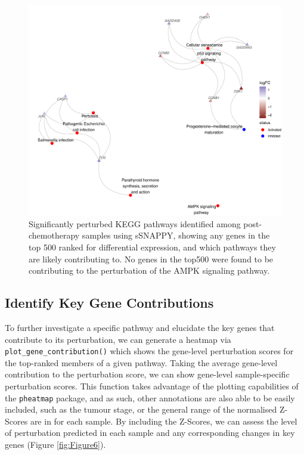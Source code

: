 \documentclass[9pt,a4paper,]{extarticle}
\begin{document}
\begin{figure}

{\centering \includegraphics[width=0.8\linewidth]{sSNAPPY_paper_files/figure-latex/Figure5-1} 

}

\caption{Significantly perturbed KEGG pathways identified among post-chemotherapy samples using sSNAPPY, showing any genes in the top 500 ranked for differential expression, and which pathways they are likely contributing to. No genes in the top500 were found to be contributing to the perturbation of the AMPK signaling pathway.}\label{fig:Figure5}
\end{figure}

\hypertarget{identify-key-gene-contributions}{%
\subsection{Identify Key Gene Contributions}\label{identify-key-gene-contributions}}

To further investigate a specific pathway and elucidate the key genes that contribute to its perturbation, we can generate a heatmap via \texttt{plot\_gene\_contribution()} which shows the gene-level perturbation scores for the top-ranked members of a given pathway.
Taking the average gene-level contribution to the perturbation score, we can show gene-level sample-specific perturbation scores.
This function takes advantage of the plotting capabilities of the \texttt{pheatmap} package\citep{pheatmap}, and as such, other annotations are also able to be easily included, such as the tumour stage, or the general range of the normalised Z-Scores are in for each sample.
By including the Z-Scores, we can assess the level of perturbation predicted in each sample and any corresponding changes in key genes (Figure \ref{fig:Figure6}).
\end{document}
